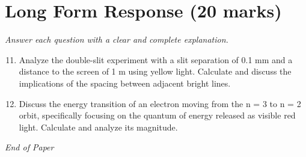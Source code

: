 \documentclass[12pt]{article}
\begin{document}
\section*{Long Form Response (20 marks)}
\textit{Answer each question with a clear and complete explanation.}
\begin{enumerate}[label=\arabic*.]
\setcounter{enumi}{10}
\item Analyze the double-slit experiment with a slit separation of 0.1 mm and a distance to the screen of 1 m using yellow light. Calculate and discuss the implications of the spacing between adjacent bright lines.
\item Discuss the energy transition of an electron moving from the n = 3 to n = 2 orbit, specifically focusing on the quantum of energy released as visible red light. Calculate and analyze its magnitude.
\end{enumerate}

\vfill
\noindent\textit{End of Paper}
\end{document}
